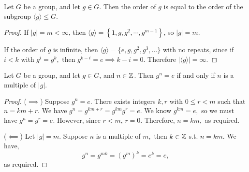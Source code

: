 \begin{theorem}
  Let $G$ be a group, and let $g\in G$. Then the order of $g$ is equal to the order of the subgroup $\langle g \rangle \leq G$.
\end{theorem}
\begin{proof}
  
  If $|g|=m<\infty$, then $\langle g \rangle =\left\{ 1,g,g^2,
  \cdots, g^{m-1} \right\}$, so $|g|=m.$ 
  
  If the order of $g$ is infinite, then $\langle g\rangle =\{e,g,g^2,g^3,\ldots \}$ with no repeats, since if $i < k$ with $g^i=g^k,$ then $g^{k-i} = e \implies k-i= 0$.
  Therefore 
  $|\langle g \rangle| = \infty$. 
\end{proof}

\begin{theorem}
  Let $G$ be a group, and let $g\in G$, and $n\in\mathbb Z$. Then $g^n=e$ if and only if $n$ is a multiple
  of $|g|$.
\end{theorem}
\begin{proof}

($\implies$) Suppose $g^n=e$. There exists integers $k,r$ with $0\leq r<m$ such that $n=km+r.$ We have $g^n=g^{km+r}=g^{km}g^r=e.$ We know $g^{km}=e,$ so we must have $g^n=g^r=e.$ However, since $r<m$, $r=0$. Therefore, $n=km,$ as required.

($\impliedby$) Let $|g|=m$. Suppose $n$ is a multiple of $m,$ then \exists $k\in \mathbb Z$ s.t. $n=km.$ We have,
$$g^n=g^{mk}=(g^m)^k = e^k = e,$$
as required. 
\end{proof}



